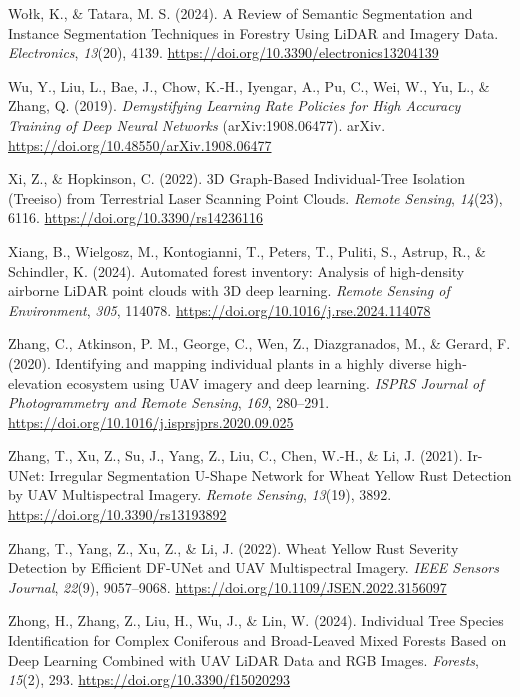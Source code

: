 \documentclass[
]{scrreprt}
\newlength{\cslhangindent}
\newenvironment{CSLReferences}[2] %
 {\begin{list}{}{%
  \setlength{\itemindent}{0pt}
  \setlength{\leftmargin}{0pt}
  \setlength{\parsep}{0pt}
  \setlength{\baselineskip}{12pt}
  \ifodd #1
   \setlength{\leftmargin}{\cslhangindent}
   \setlength{\itemindent}{-1\cslhangindent}
  \fi
  \setlength{\itemsep}{4pt}}}
 {\end{list}}
\begin{document}
\begin{CSLReferences}{1}{0}
Wołk, K., \& Tatara, M. S. (2024). A {Review} of {Semantic Segmentation}
and {Instance Segmentation Techniques} in {Forestry Using LiDAR} and
{Imagery Data}. \emph{Electronics}, \emph{13}(20), 4139.
\url{https://doi.org/10.3390/electronics13204139}

Wu, Y., Liu, L., Bae, J., Chow, K.-H., Iyengar, A., Pu, C., Wei, W., Yu,
L., \& Zhang, Q. (2019). \emph{Demystifying {Learning Rate Policies} for
{High Accuracy Training} of {Deep Neural Networks}} (arXiv:1908.06477).
arXiv. \url{https://doi.org/10.48550/arXiv.1908.06477}

Xi, Z., \& Hopkinson, C. (2022). {3D Graph-Based Individual-Tree
Isolation} ({Treeiso}) from {Terrestrial Laser Scanning Point Clouds}.
\emph{Remote Sensing}, \emph{14}(23), 6116.
\url{https://doi.org/10.3390/rs14236116}

Xiang, B., Wielgosz, M., Kontogianni, T., Peters, T., Puliti, S.,
Astrup, R., \& Schindler, K. (2024). Automated forest inventory:
{Analysis} of high-density airborne {LiDAR} point clouds with {3D} deep
learning. \emph{Remote Sensing of Environment}, \emph{305}, 114078.
\url{https://doi.org/10.1016/j.rse.2024.114078}

Zhang, C., Atkinson, P. M., George, C., Wen, Z., Diazgranados, M., \&
Gerard, F. (2020). Identifying and mapping individual plants in a highly
diverse high-elevation ecosystem using {UAV} imagery and deep learning.
\emph{ISPRS Journal of Photogrammetry and Remote Sensing}, \emph{169},
280--291. \url{https://doi.org/10.1016/j.isprsjprs.2020.09.025}

Zhang, T., Xu, Z., Su, J., Yang, Z., Liu, C., Chen, W.-H., \& Li, J.
(2021). Ir-{UNet}: {Irregular Segmentation U-Shape Network} for {Wheat
Yellow Rust Detection} by {UAV Multispectral Imagery}. \emph{Remote
Sensing}, \emph{13}(19), 3892. \url{https://doi.org/10.3390/rs13193892}

Zhang, T., Yang, Z., Xu, Z., \& Li, J. (2022). Wheat {Yellow Rust
Severity Detection} by {Efficient DF-UNet} and {UAV Multispectral
Imagery}. \emph{IEEE Sensors Journal}, \emph{22}(9), 9057--9068.
\url{https://doi.org/10.1109/JSEN.2022.3156097}

Zhong, H., Zhang, Z., Liu, H., Wu, J., \& Lin, W. (2024). Individual
{Tree Species Identification} for {Complex Coniferous} and {Broad-Leaved
Mixed Forests Based} on {Deep Learning Combined} with {UAV LiDAR Data}
and {RGB Images}. \emph{Forests}, \emph{15}(2), 293.
\url{https://doi.org/10.3390/f15020293}


\end{CSLReferences}
\end{document}
